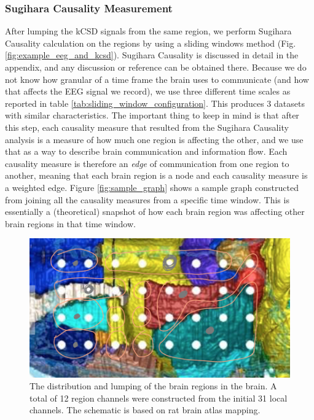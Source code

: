 \documentclass[journal,12pt,onecolumn,draftclsnofoot]{IEEEtran}  %
\begin{document}
\subsubsection{Sugihara Causality Measurement}
After lumping the kCSD signals from the same region, we perform Sugihara Causality calculation on the regions by using a sliding windows method (Fig. \ref{fig:example_eeg_and_kcsd}). Sugihara Causality is discussed in detail in the appendix, and any discussion or reference can be obtained there. Because we do not know how granular of a time frame the brain uses to communicate (and how that affects the EEG signal we record), we use three different time scales as reported in table \ref{tab:sliding_window_configuration}. This produces 3 datasets with similar characteristics. The important thing to keep in mind is that after this step, each causality measure that resulted from the Sugihara Causality analysis is a measure of how much one region is affecting the other, and we use that as a way to describe brain communication and information flow. Each causality measure is therefore an \textit{edge} of communication from one region to another, meaning that each brain region is a node and each causality measure is a weighted edge. Figure \ref{fig:sample_graph} shows a sample graph constructed from joining all the causality measures from a specific time window. This is essentially a (theoretical) snapshot of how each brain region was affecting other brain regions in that time window.

\begin{figure}[H]
  \centering
  \includegraphics[width=0.65\linewidth]{figures/brain_region_lump.png}
  \caption{The distribution and lumping of the brain regions in the brain. A total of 12 region channels were constructed from the initial 31 local channels. The schematic is based on rat brain atlas mapping.}
  \label{fig:brain_region_lumping}
\end{figure}
\end{document}
